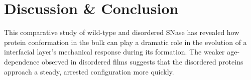 \section{Discussion \& Conclusion}

This comparative study of wild-type and disordered SNase has revealed how protein conformation in the bulk can play a dramatic role in the evolution of a interfacial layer's mechanical response during its formation. The weaker age-dependence observed in disordered films suggests that the disordered proteins approach a steady, arrested configuration more quickly.